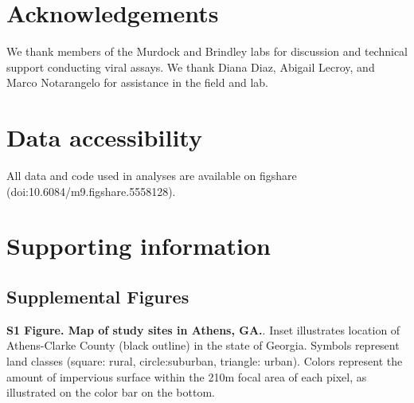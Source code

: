 \documentclass[12pt]{article}
\begin{document}
\section{Acknowledgements}
We thank members of the Murdock and Brindley labs for discussion and technical support conducting viral assays. We thank Diana Diaz, Abigail Lecroy, and Marco Notarangelo for assistance in the field and lab.



\section{Data accessibility}
All data and code used in analyses are available on figshare (doi:10.6084/m9.figshare.5558128).

\section{Supporting information}

\setlength\parindent{0pt}%

\subsection{Supplemental Figures}

\textbf{S1 Figure. Map of study sites in Athens, GA.}. Inset illustrates location of Athens-Clarke County (black outline) in the state of Georgia. Symbols represent land classes (square: rural, circle:suburban, triangle: urban). Colors represent the amount of impervious surface within the 210m focal area of each pixel, as illustrated on the color bar on the bottom.
\end{document}
